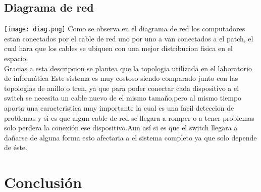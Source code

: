 \documentclass{udpreport}
\begin{document}
\section{Diagrama de red}
\texttt{[image: diag.png]}
Como se observa en el diagrama de red los computadores estan conectados por el cable de red uno por uno 
a van conectados a el patch, el cual hara que los cables se ubiquen con una mejor distribucion fisica 
en el espacio.\\
Gracias a esta descripcion se plantea que la topologia utilizada en el laboratorio de informática
Este sistema es muy costoso siendo comparado junto con las topologias de anillo o tren, ya que para poder
conectar cada dispositivo a el switch se necesita un cable nuevo de el mismo tamaño,pero al mismo tiempo
aporta una caracteristica muy importante la cual es una facil deteccion de problemas y si es que algun
cable de red se llegara a romper o a tener problemas solo perdera la conexión  ese dispositivo.Aun así 
si es que el switch llegara a dañarse de alguna forma esto afectaria a el sistema completo ya que solo
depende de éste.

\chapter{Conclusión}
\end{document}
